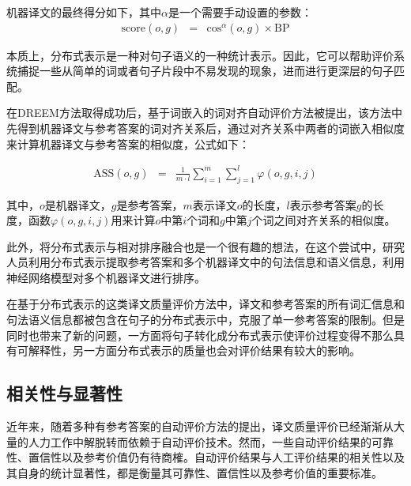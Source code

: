 \parinterval 机器译文的最终得分如下，其中$\alpha$是一个需要手动设置的参数：
\begin{eqnarray}
\textrm{score}(o,g) &=& \textrm{cos}{^\alpha }(o,g) \times \textrm{BP}
\label{eq:4-18}
\end{eqnarray}

\parinterval 本质上，分布式表示是一种对句子语义的一种统计表示。因此，它可以帮助评价系统捕捉一些从简单的词或者句子片段中不易发现的现象，进而进行更深层的句子匹配。

\parinterval 在DREEM方法取得成功后，基于词嵌入的词对齐自动评价方法被提出，该方法中先得到机器译文与参考答案的词对齐关系后，通过对齐关系中两者的词嵌入相似度来计算机器译文与参考答案的相似度，公式如下：

\begin{eqnarray}
\textrm{ASS}(o,g) &=& \frac{1}{{m \cdot l}}\sum\limits_{i = 1}^{m} {\sum\limits_{j = 1}^{l} {\varphi (o,g,i,j)} }
\label{eq:4-19}
\end{eqnarray}

\noindent 其中，$o$是机器译文，$g$是参考答案，$m$表示译文$o$的长度，$l$表示参考答案$g$的长度，函数$\varphi(o,g,i,j)$用来计算$o$中第$i$个词和$g$中第$j$个词之间对齐关系的相似度。

\parinterval 此外，将分布式表示与相对排序融合也是一个很有趣的想法，在这个尝试中，研究人员利用分布式表示提取参考答案和多个机器译文中的句法信息和语义信息，利用神经网络模型对多个机器译文进行排序。

\parinterval 在基于分布式表示的这类译文质量评价方法中，译文和参考答案的所有词汇信息和句法语义信息都被包含在句子的分布式表示中，克服了单一参考答案的限制。但是同时也带来了新的问题，一方面将句子转化成分布式表示使评价过程变得不那么具有可解释性，另一方面分布式表示的质量也会对评价结果有较大的影响。


\subsection{相关性与显著性}

\parinterval 近年来，随着多种有参考答案的自动评价方法的提出，译文质量评价已经渐渐从大量的人力工作中解脱转而依赖于自动评价技术。然而，一些自动评价结果的可靠性、置信性以及参考价值仍有待商榷。自动评价结果与人工评价结果的相关性以及其自身的统计显著性，都是衡量其可靠性、置信性以及参考价值的重要标准。

